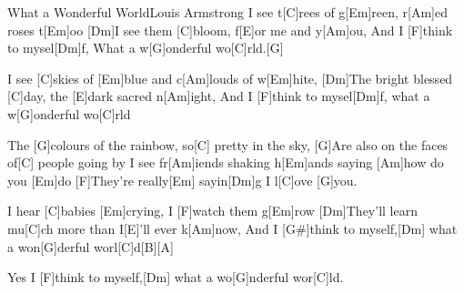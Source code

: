 \documentclass[../main.tex]{subfiles}
\begin{document}
\begin{song}[5]{What a Wonderful World}{Louis Armstrong}{}
I see t[C]rees of g[Em]reen, r[Am]ed roses t[Em]oo
[Dm]I see them [C]bloom, f[E]or me and y[Am]ou,
And I [F]think to mysel[Dm]f, What a w[G]onderful wo[C]rld.[G]{\hh}

I see [C]skies of [Em]blue and c[Am]louds of w[Em]hite,
[Dm]The bright blessed [C]day, the [E]dark sacred n[Am]ight,
And I [F]think to mysel[Dm]f, what a w[G]onderful wo[C]rld

The [G]colours of the rainbow, so[C] pretty in the sky,
[G]Are also on the faces of[C] people going by
I see fr[Am]iends shaking h[Em]ands saying [Am]how do you [Em]do
[F]They’re really[Em] sayin[Dm]g I l[C]ove [G]you.

I hear [C]babies [Em]crying, I [F]watch them g[Em]row
[Dm]They'll learn mu[C]ch more than I[E]'ll ever k[Am]now,
And I [G#]think to myself,[Dm] what a won[G]derful worl[C]d[B]{\hh}[A]{\hh}

Yes I [F]think to myself,[Dm] what a wo[G]nderful wor[C]ld.

\end{song}
\end{document}
